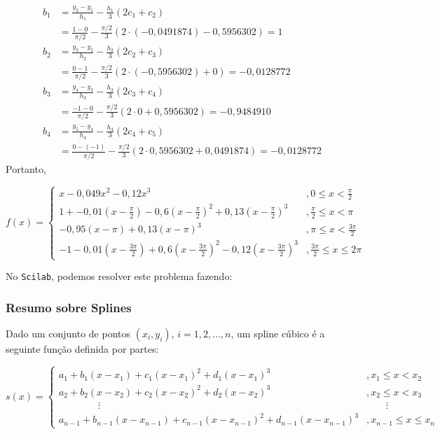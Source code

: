 \documentclass[main.tex]{subfiles}
\begin{document}
\begin{align*}
b_1&= \frac{y_{2}-y_1}{h_1}-\frac{h_1}{3}(2c_1+c_{2})\\
&=\frac{1-0}{\pi/2}-\frac{\pi/2}{3}(2\cdot (-0,0491874)-0,5956302)=1\\
b_2&=\frac{y_{3}-y_2}{h_2}-\frac{h_2}{3}(2c_2+c_{3})\\
&=\frac{0-1}{\pi/2}-\frac{\pi/2}{3}(2\cdot(-0,5956302) +0)=-0,0128772\\
b_3&=\frac{y_{4}-y_3}{h_3}-\frac{h_3}{3}(2c_3+c_{4})\\
&=\frac{-1-0}{\pi/2}-\frac{\pi/2}{3}(2\cdot 0+0,5956302)=-0,9484910\\
b_4&=\frac{y_{5}-y_4}{h_4}-\frac{h_4}{3}(2c_4+c_{5})\\
&=\frac{0-(-1)}{\pi/2}-\frac{\pi/2}{3}(2\cdot 0,5956302+0,0491874)=-0,0128772
\end{align*}
Portanto,
\begin{small}
\begin{equation*}
f(x)=\left\{\begin{array}{ll}
x-0,049x^2-0,12x^3&, 0\leq x<\frac{\pi}{2}\\
1+-0,01(x-\frac{\pi}{2})-0,6(x-\frac{\pi}{2})^2+0,13(x-\frac{\pi}{2})^3&, \frac{\pi}{2}\leq x<\pi\\
-0,95(x-\pi)+0,13(x-\pi)^3&, \pi\leq x<\frac{3\pi}{2}\\
-1-0,01(x-\frac{3\pi}{2})+0,6(x-\frac{3\pi}{2})^2-0,12(x-\frac{3\pi}{2})^3&, \frac{3\pi}{2}\leq x\leq2\pi
\end{array}\right.
\end{equation*}  
\end{small}

\ifisscilab
No \verb+Scilab+, podemos resolver este problema fazendo:

\fi

\subsubsection{Resumo sobre Splines}

Dado um conjunto de pontos $(x_i,y_i)$, $i=1,2,\ldots,n$, um spline cúbico é a seguinte função definida por partes:
\begin{small}
\begin{equation*}
  s(x) \!=\! \left\{\begin{array}{ll}
       \!\!\!a_1 \!+\! b_1(x\!-\!x_1) \!+\! c_1(x\!-\!x_1)^2 \!+\! d_1(x\!-\!x_1)^3 &\!\!\!\!\!, x_1\leq x < x_2\\
      \!\!\!a_2 \!+\! b_2(x\!-\!x_2) \!+\! c_2(x\!-\!x_2)^2 \!+\! d_2(x\!-\!x_2)^3 &\!\!\!\!\!, x_2 \leq x < x_3\\
      \qquad\qquad \vdots & \qquad\vdots \\
      \!\!\!a_{n-1} \!+\! b_{n-1}(x\!-\!x_{n-1}) \!+\! c_{n-1}(x\!-\!x_{n-1})^2 \!+\! d_{n-1}(x\!-\!x_{n-1})^3 &\!\!\!\!\!, x_{n-1} \leq x \leq x_n \end{array}\right.
\end{equation*}  
\end{small}
\end{document}
